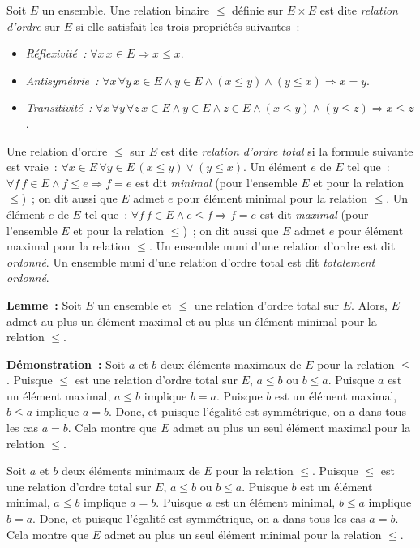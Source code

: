 Soit $E$ un ensemble. 
Une relation binaire $\leq$ définie sur $E \times E$ est dite \textit{relation d'ordre} sur $E$ si elle satisfait les trois propriétés suivantes : 
\begin{itemize}[nosep]
    \item \textit{Réflexivité :} $\forall x \, x \in E \Rightarrow x \leq x$.
    \item \textit{Antisymétrie :} $\forall x \, \forall y \, x \in E \wedge y \in E \wedge (x \leq y) \wedge (y \leq x) \Rightarrow x = y$.
    \item \textit{Transitivité :} $\forall x \, \forall y \, \forall z \, x \in E \wedge y \in E \wedge z \in E \wedge (x \leq y) \mathrel{\wedge} (y \leq z) \Rightarrow x \leq z$.
\end{itemize}
Une relation d'ordre $\leq$ sur $E$ est dite \textit{relation d'ordre total} si la formule suivante est vraie : $\forall x \in E \, \forall y \in E \, (x \leq y) \vee (y \leq x)$.
Un élément $e$ de $E$ tel que : $\forall f \, f \in E \wedge f \leq e \Rightarrow f = e$ est dit \textit{minimal} (pour l'ensemble $E$ et pour la relation $\leq$) ; on dit aussi que $E$ admet $e$ pour élément minimal pour la relation $\leq$. 
Un élément $e$ de $E$ tel que : $\forall f \, f \in E \wedge e \leq f \Rightarrow f = e$ est dit \textit{maximal} (pour l'ensemble $E$ et pour la relation $\leq$) ; on dit aussi que $E$ admet $e$ pour élément maximal pour la relation $\leq$. 
Un ensemble muni d'une relation d'ordre est dit \textit{ordonné}.
Un ensemble muni d'une relation d'ordre total est dit \textit{totalement ordonné}.

\medskip

\noindent\textbf{Lemme :} Soit $E$ un ensemble et $\leq$ une relation d'ordre total sur $E$. 
    Alors, $E$ admet au plus un élément maximal et au plus un élément minimal pour la relation $\leq$. 

\medskip

\noindent\textbf{Démonstration :} 
    Soit $a$ et $b$ deux éléments maximaux de $E$ pour la relation $\leq$.
    Puisque $\leq$ est une relation d'ordre total sur $E$, $a \leq b$ ou $b \leq a$. 
    Puisque $a$ est un élément maximal, $a \leq b$ implique $b = a$.
    Puisque $b$ est un élément maximal, $b \leq a$ implique $a = b$.
    Donc, et puisque l'égalité est symmétrique, on a dans tous les cas $a = b$.
    Cela montre que $E$ admet au plus un seul élément maximal pour la relation $\leq$.
    
    Soit $a$ et $b$ deux éléments minimaux de $E$ pour la relation $\leq$.
    Puisque $\leq$ est une relation d'ordre total sur $E$, $a \leq b$ ou $b \leq a$. 
    Puisque $b$ est un élément minimal, $a \leq b$ implique $a = b$.
    Puisque $a$ est un élément minimal, $b \leq a$ implique $b = a$.
    Donc, et puisque l'égalité est symmétrique, on a dans tous les cas $a = b$.
    Cela montre que $E$ admet au plus un seul élément minimal pour la relation $\leq$.

